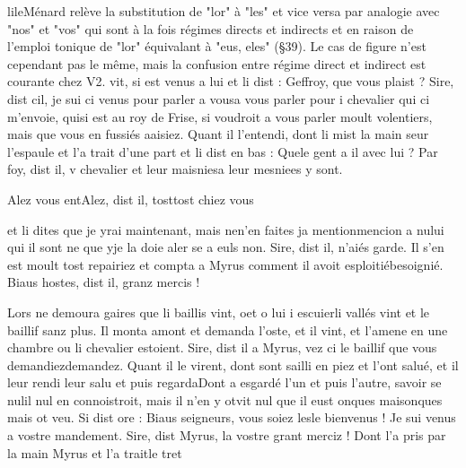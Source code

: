 \documentclass{article}
\begin{document}
\begin{pages}
                  lileMénard relève la substitution de "lor" à "les" et
                  vice versa par analogie avec "nos" et "vos" qui sont à la fois régimes directs et
                  indirects et en raison de l'emploi tonique de "lor" équivalant à "eus, eles"
                  (§39). Le cas de figure n'est cependant pas le même, mais la confusion entre
                  régime direct et indirect est courante chez V2. vit, si est venus a lui et
               li dist : Geffroy, que vous plaist ?
               Sire, dist cil, je sui ci venus 
                     pour parler a vousa vous parler pour i chevalier qui ci
                     m’envoie, 
                     quisi est au roy de Frise, si voudroit a vous parler moult volentiers, mais
                  que vous en fussiés aaisiez. Quant il l’entendi, dont li mist la main seur
               l’espaule et l'a trait d’une part et li dist en bas : Quele gent a il avec lui ?
               Par foy, dist il, v chevalier 
                     et leur maisniesa leur mesniees y sont.
               
                     Alez vous entAlez, dist il, 
                     tosttost chiez vous
                  
                     et li dites que je yrai maintenant, mais 
                     nen'en faites ja 
                     mentionmencion a nului qui il sont ne que 
                     yje la doie aler se a euls non.
               Sire, dist il, n’aiés garde. Il s’en est
               moult tost repairiez et compta a Myrus
               comment il avoit 
                     esploitiébesoignié. Biaus hostes, dist il, granz
                  mercis !
               
                  Lors ne demoura gaires que 
                  li baillis vint, 
                        oet o lui i escuierli vallés vint et le baillif sanz plus. Il monta amont et demanda l’oste, 
                  et il vint, et l’amene en une chambre ou li chevalier estoient. Sire, dist il a Myrus, vez ci le baillif que vous 
                     demandiezdemandez. Quant il le virent, dont 
                  sont sailli en piez et l’ont salué, et il leur rendi leur salu et 
                  puis regardaDont a esgardé l’un et puis l’autre, savoir se 
                  nulil nul en connoistroit, mais il n’en y 
                  otvit nul que il 
                  eust onques maisonques mais ot veu. Si dist ore : Biaus seigneurs, vous
                  soiez 
                     lesle bienvenus ! Je sui venus a vostre mandement.
               Sire, dist Myrus,
                  la vostre grant merciz !
               Dont l’a pris par la main Myrus et 
                  l’a traitle tret
               

\end{pages}
\end{document}
